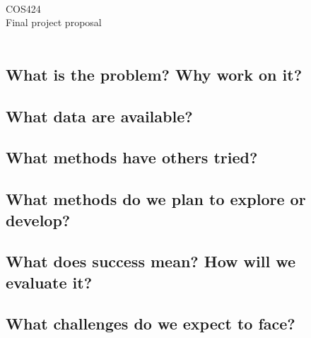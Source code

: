 \documentclass[11pt]{article}
\begin{document}
\setcounter{section}{0}
\setcounter{subsection}{0}
\setcounter{subsubsection}{0}
\ \ \\
COS424 \\
Final project proposal
\\ \\

\subsection*{What is the problem? Why work on it?}

\subsection*{What data are available?}

\subsection*{What methods have others tried?}

\subsection*{What methods do we plan to explore or develop?}

\subsection*{What does success mean? How will we evaluate it?}

\subsection*{What challenges do we expect to face?}
\end{document}
